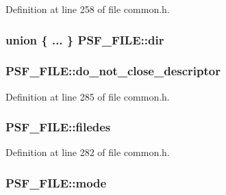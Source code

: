 Definition at line 258 of file common.\+h.

\subsubsection[{\texorpdfstring{dir}{dir}}]{\setlength{\rightskip}{0pt plus 5cm}union \{ ... \}   P\+S\+F\+\_\+\+F\+I\+L\+E\+::dir}\hypertarget{struct_p_s_f___f_i_l_e_a73144bbf9531d78f55ace475aad0d5d5}{}\label{struct_p_s_f___f_i_l_e_a73144bbf9531d78f55ace475aad0d5d5}
\subsubsection[{\texorpdfstring{do\+\_\+not\+\_\+close\+\_\+descriptor}{do_not_close_descriptor}}]{ P\+S\+F\+\_\+\+F\+I\+L\+E\+::do\+\_\+not\+\_\+close\+\_\+descriptor}\hypertarget{struct_p_s_f___f_i_l_e_afbec12bd6fa6b076331b7bd15b422e74}{}\label{struct_p_s_f___f_i_l_e_afbec12bd6fa6b076331b7bd15b422e74}


Definition at line 285 of file common.\+h.

\subsubsection[{\texorpdfstring{filedes}{filedes}}]{ P\+S\+F\+\_\+\+F\+I\+L\+E\+::filedes}\hypertarget{struct_p_s_f___f_i_l_e_a32448e09e1bd0b3451acfc9710b8a47e}{}\label{struct_p_s_f___f_i_l_e_a32448e09e1bd0b3451acfc9710b8a47e}


Definition at line 282 of file common.\+h.

\subsubsection[{\texorpdfstring{mode}{mode}}]{ P\+S\+F\+\_\+\+F\+I\+L\+E\+::mode}\hypertarget{struct_p_s_f___f_i_l_e_a79dc5fc1f9c6e1da23a11014d105e7fd}{}\label{struct_p_s_f___f_i_l_e_a79dc5fc1f9c6e1da23a11014d105e7fd}


